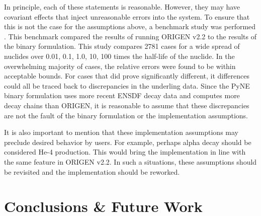 \documentclass{anstrans}
\begin{document}
In principle, each of these statements is reasonable. However, they may 
have covariant effects that inject unreasonable errors into the system.
To ensure that this is not the case for the assumptions above, 
a benchmark study was performed \cite{benchmark}. This benchmark compared
the results of running ORIGEN v2.2 \cite{croff1980origen2} to the results of 
the binary formulation. This study compares 2781 cases for a wide spread of
nuclides over 0.01, 0.1, 1.0, 10, 100 times the half-life of the nuclide.
In the overwhelming majority of cases, the relative errors were found to be 
within acceptable bounds.  For cases that did prove significantly different, 
it differences could all be traced back to discrepancies in the underling 
data. Since the PyNE binary formulation uses more recent ENSDF decay 
data \cite{bhat1992evaluated} and computes more decay chains than ORIGEN, 
it is reasonable to assume that these discrepancies are not the fault of the 
binary formulation or the implementation assumptions.

It is also important to mention that these implementation assumptions 
may preclude desired behavior by users. For example, perhaps alpha decay 
should be considered He-4 production. This would bring the implementation in
line with the same feature in ORIGEN v2.2. In such a situations, these 
assumptions should be revisited and the implementation should be reworked.

\section{Conclusions \& Future Work}




\end{document}
